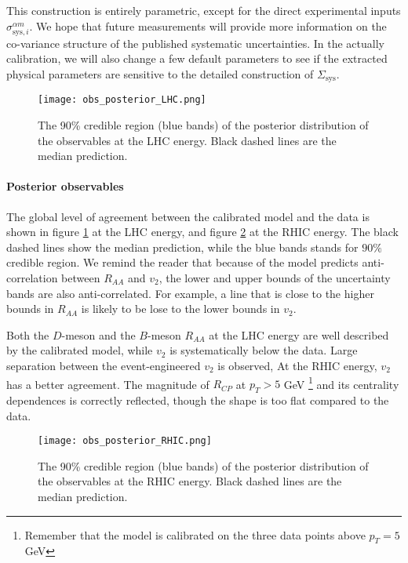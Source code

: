 This construction is entirely parametric, except for the direct experimental inputs $\sigma^{\alpha m}_{\textrm{sys}, i}$.
We hope that future measurements will provide more information on the co-variance structure of the published systematic uncertainties.
In the actually calibration, we will also change a few default parameters to see if the extracted physical parameters are sensitive to the detailed construction of $\Sigma_{\textrm{sys}}$.

\begin{figure}
\centering
\texttt{[image: obs\_posterior\_LHC.png]}
\caption{The 90\% credible region (blue bands) of the posterior distribution of the observables at the LHC energy. Black dashed lines are the median prediction.}
\label{fig:new:obs_posterior_LHC}
\end{figure}

\paragraph{Posterior observables} The global level of agreement between the calibrated model and the data is shown in figure \ref{fig:new:obs_posterior_LHC} at the LHC energy, and figure \ref{fig:new:obs_posterior_RHIC} at the RHIC energy.
The black dashed lines show the median prediction, while the blue bands stands for $90\%$ credible region.
We remind the reader that because of the model predicts anti-correlation between $R_{AA}$ and $v_2$, the lower and upper bounds of the uncertainty bands are also anti-correlated.
For example, a line that is close to the higher bounds in $R_{AA}$ is likely to be lose to the lower bounds in $v_2$.

Both the $D$-meson and the $B$-meson $R_{AA}$ at the LHC energy are well described by the calibrated model, while $v_2$ is systematically below the data.
Large separation between the event-engineered $v_2$ is observed, 
At the RHIC energy, $v_2$ has a better agreement. 
The magnitude of $R_{CP}$ at $p_T> 5$ GeV \footnote{Remember that the model is calibrated on the three data points above $p_T=5$ GeV} and its centrality dependences is correctly reflected, though the shape is too flat compared to the data.

\begin{figure}
\centering
\texttt{[image: obs\_posterior\_RHIC.png]}
\caption{The 90\% credible region (blue bands) of the posterior distribution of the observables at the RHIC energy. Black dashed lines are the median prediction.}
\label{fig:new:obs_posterior_RHIC}
\end{figure}

